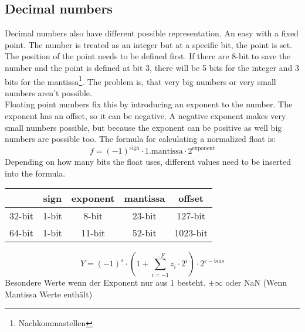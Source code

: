 \documentclass[a4paper]{scrartcl}
\begin{document}
        \subsection*{Decimal numbers}
        Decimal numbers also have different possible representation. An easy with a fixed point. The number is treated as an integer but at a specific bit, the point is 
        set. The position of the point needs to be defined first. If there are 8-bit to save the number and the point is defined at bit 3, there will be 5 bits for the integer
        and 3 bits for the mantissa\footnote{Nachkommastellen}. The problem is, that very big numbers or very small numbers aren't possible. \\
        Floating point numbers fix this by introducing an exponent to the number. The exponent has an offset, so it can be negative. A negative exponent makes very small numbers
        possible, but because the exponent can be positive as well big numbers are possible too. The formula for calculating a normalized float is:
        \begin{equation*}
            f = (-1)^{\text{sign}} \cdot 1.\text{mantissa} \cdot 2^{\text{exponent}}
        \end{equation*}  
        Depending on how many bits the float uses, different values need to be inserted into the formula.
        \begin{center}\begin{tabular}{|c|c|c|c|c|}
            \hline
             & sign & exponent & mantissa & offset  \\
            \hline
            32-bit & 1-bit & 8-bit & 23-bit & 127-bit \\
            \hline
            64-bit & 1-bit & 11-bit & 52-bit & 1023-bit \\
            \hline
        \end{tabular}\end{center}
        $$Y = (-1)^s\cdot \left(1+\sum_{i=-1}^{-F}z_i\cdot 2^i\right)\cdot 2^{e-bias}$$
        Besondere Werte wenn der Exponent nur aus 1 besteht.
        $\pm \infty$ oder NaN (Wenn Mantissa Werte enthält)
        
\end{document}

